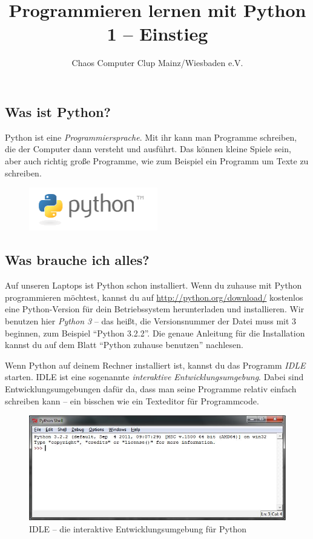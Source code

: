 



	\title{Programmieren lernen mit Python\\1 – Einstieg}
	\author{Chaos Computer Clup Mainz/Wiesbaden e.V.}
	\maketitle
	
	\subsection*{Was ist Python?}
	Python ist eine \emph{Programmiersprache}. Mit ihr kann man Programme schreiben, die der Computer dann versteht und ausführt. Das können kleine Spiele sein, aber auch richtig große Programme, wie zum Beispiel ein Programm um Texte zu schreiben.
	
	\begin{figure}[htbp]
		\centering
		\includegraphics[width=0.5\textwidth]{img/python-logo.png}
	\end{figure}
	
	\subsection*{Was brauche ich alles?}
	Auf unseren Laptops ist Python schon installiert. Wenn du zuhause mit Python programmieren möchtest, kannst du auf \url{http://python.org/download/} kostenlos eine Python-Version für dein Betriebssystem herunterladen und installieren. Wir benutzen hier \emph{Python 3} – das heißt, die Versionsnummer der Datei muss mit 3 beginnen, zum Beispiel \enquote{Python 3.2.2}. Die  genaue Anleitung für die Installation kannst du auf dem Blatt \enquote{Python zuhause benutzen} nachlesen.
	
	Wenn Python auf deinem Rechner installiert ist, kannst du das Programm \emph{IDLE} starten. IDLE ist eine sogenannte \emph{interaktive Entwicklungsumgebung}. Dabei sind Entwicklungsumgebungen dafür da, dass man seine Programme relativ einfach schreiben kann – ein bisschen wie ein Texteditor für Programmcode.
	
	\begin{figure}[htbp]
		\centering
		\includegraphics[width=1\textwidth]{img/idle.jpg}
		\caption{IDLE – die interaktive Entwicklungsumgebung für Python}
		\label{IDLE}
	\end{figure}
	
